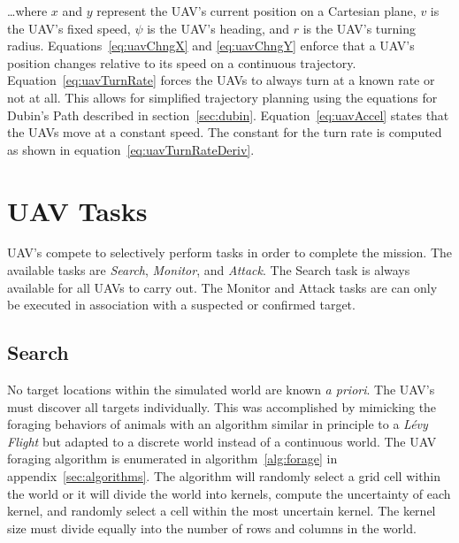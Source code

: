 \dots where $x$ and $y$ represent the UAV's current position on a Cartesian plane, $v$ is the UAV's fixed speed, $\psi$ is the UAV's heading, and $r$ is the UAV's turning radius.  Equations~\ref{eq:uavChngX} and \ref{eq:uavChngY} enforce that a UAV's position changes relative to its speed on a continuous trajectory.  Equation~\ref{eq:uavTurnRate} forces the UAVs to always turn at a known rate or not at all.  This allows for simplified trajectory planning using the equations for Dubin's Path described in section~\ref{sec:dubin}.  Equation~\ref{eq:uavAccel} states that the UAVs move at a constant speed.  The constant for the turn rate is computed as shown in equation~\ref{eq:uavTurnRateDeriv}.






\section{UAV Tasks}
UAV's compete to selectively perform tasks in order to complete the mission.  The available tasks are \textit{Search}, \textit{Monitor}, and \textit{Attack}.  The Search task is always available for all UAVs to carry out.  The Monitor and Attack tasks are can only be executed in association with a suspected or confirmed target.

\subsection{Search}
No target locations within the simulated world are known \textit{a priori}.  The UAV's must discover all targets individually.  This was accomplished by mimicking the foraging behaviors of animals with an algorithm similar in principle to a \textit{L\'evy Flight} but adapted to a discrete world instead of a continuous world.   The UAV foraging algorithm is enumerated in algorithm~\ref{alg:forage} in appendix~\ref{sec:algorithms}.  The algorithm will randomly select a grid cell within the world or it will divide the world into kernels, compute the uncertainty of each kernel, and randomly select a cell within the most uncertain kernel.  The kernel size must divide equally into the number of rows and columns in the world.


